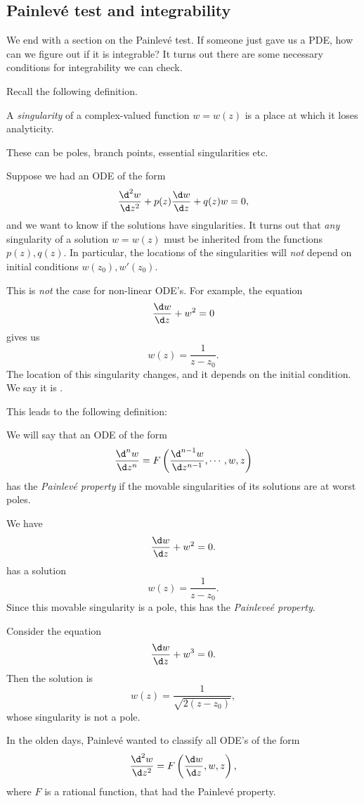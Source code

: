 \documentclass[a4paper]{article}
\begin{document}
\subsection{\texorpdfstring{Painlev\'e}{Painleve} test and integrability}
We end with a section on the Painlev\'e test. If someone just gave us a PDE, how can we figure out if it is integrable? It turns out there are some necessary conditions for integrability we can check.

Recall the following definition.
\begin{defi}[Singularirty]
  A \emph{singularity} of a complex-valued function $w = w(z)$ is a place at which it loses analyticity.
\end{defi}
These can be poles, branch points, essential singularities etc.

Suppose we had an ODE of the form
\[
  \frac{\d^2 w}{\d z^2} + p(z) \frac{\d w}{ \d z} + q(z) w = 0,
\]
and we want to know if the solutions have singularities. It turns out that \emph{any} singularity of a solution $w = w(z)$ must be inherited from the functions $p(z), q(z)$. In particular, the locations of the singularities will \emph{not} depend on initial conditions $w(z_0), w'(z_0)$.

This is \emph{not} the case for non-linear ODE's. For example, the equation
\[
  \frac{\d w}{\d z} + w^2 = 0
\]
gives us
\[
  w(z) = \frac{1}{z - z_0}.
\]
The location of this singularity changes, and it depends on the initial condition. We say it is .

This leads to the following definition:
\begin{defi}
  We will say that an ODE of the form
  \[
    \frac{\d^n w}{\d z^n} = F\left(\frac{\d^{n - 1} w}{\d z^{n - 1}}, \cdots, w, z\right)
  \]
  has the \emph{Painlev\'e property} if the movable singularities of its solutions are at worst poles.
\end{defi}

\begin{eg}
  We have
  \[
    \frac{\d w}{\d z} + w^2 = 0.
  \]
  has a solution
  \[
    w(z) = \frac{1}{z - z_0}.
  \]
  Since this movable singularity is a pole, this has the \emph{Painleve\'e property}.
\end{eg}

\begin{eg}
  Consider the equation
  \[
    \frac{\d w}{\d z} + w^3 = 0.
  \]
  Then the solution is
  \[
    w(z) = \frac{1}{\sqrt{2(z - z_0)}},
  \]
  whose singularity is not a pole.
\end{eg}
In the olden days, Painlev\'e wanted to classify all ODE's of the form
\[
  \frac{\d^2 w}{\d z^2} = F\left(\frac{\d w}{\d z}, w, z\right),
\]
where $F$ is a rational function, that had the Painlev\'e property.
\end{document}
